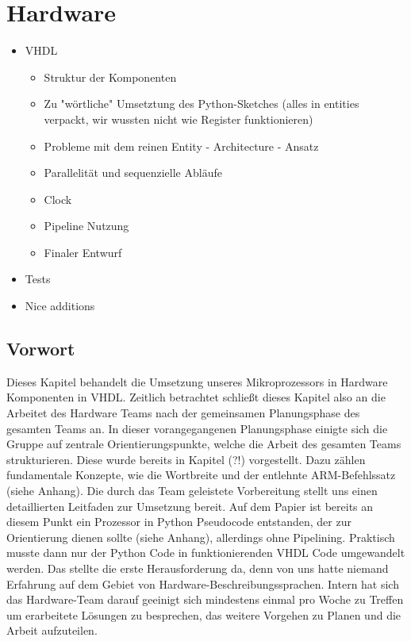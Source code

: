 \documentclass[paper=a4,fontsize=12pt,twocolumn]{scrreprt}
\begin{document}


\chapter{Hardware}

\begin{itemize}
    \item VHDL
    \begin{itemize}
        \item Struktur der Komponenten
        \item Zu "wörtliche" Umsetztung des Python-Sketches (alles in entities verpackt, wir wussten nicht wie Register funktionieren)
        \item Probleme mit dem reinen Entity - Architecture - Ansatz
        \item Parallelität und sequenzielle Abläufe
        \item Clock
        \item Pipeline Nutzung
        \item Finaler Entwurf
    \end{itemize}
    \item Tests
    \item Nice additions
\end{itemize}

\section{Vorwort}

Dieses Kapitel behandelt die Umsetzung unseres Mikroprozessors in Hardware Komponenten in VHDL.
Zeitlich betrachtet schließt dieses Kapitel also an die Arbeitet des Hardware Teams nach der gemeinsamen Planungsphase des gesamten Teams an.
In dieser vorangegangenen Planungsphase einigte sich die Gruppe auf zentrale Orientierungspunkte, welche die Arbeit des gesamten Teams strukturieren.
Diese wurde bereits in Kapitel (?!) vorgestellt.
Dazu zählen fundamentale Konzepte, wie die Wortbreite und der entlehnte ARM-Befehlssatz (siehe Anhang).
Die durch das Team geleistete Vorbereitung stellt uns einen detaillierten Leitfaden zur Umsetzung bereit.
Auf dem Papier ist bereits an diesem Punkt ein Prozessor in Python Pseudocode entstanden, der zur Orientierung dienen sollte (siehe Anhang), allerdings ohne Pipelining.
Praktisch musste dann nur der Python Code in funktionierenden VHDL Code umgewandelt werden. Das stellte die erste Herausforderung da, denn von uns hatte niemand Erfahrung auf dem Gebiet von Hardware-Beschreibungssprachen.
Intern hat sich das Hardware-Team darauf geeinigt sich mindestens einmal pro Woche zu Treffen um erarbeitete Lösungen zu besprechen, das weitere Vorgehen zu Planen und die Arbeit aufzuteilen.
\end{document}
